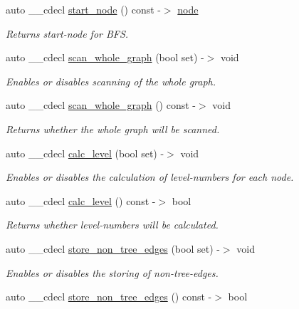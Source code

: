\begin{DoxyCompactItemize}
auto \+\_\+\+\_\+cdecl \mbox{\hyperlink{classbfs_a80a7ae50880684eb261e7e8e807645ef}{start\+\_\+node}} () const -\/$>$ \mbox{\hyperlink{classnode}{node}}
\begin{DoxyCompactList}\small\item\em Returns start-\/node for B\+FS. \end{DoxyCompactList}\item 
auto \+\_\+\+\_\+cdecl \mbox{\hyperlink{classbfs_ac58d930764e6aa859fe706b1d916b9ad}{scan\+\_\+whole\+\_\+graph}} (bool set) -\/$>$ void
\begin{DoxyCompactList}\small\item\em Enables or disables scanning of the whole graph. \end{DoxyCompactList}\item 
auto \+\_\+\+\_\+cdecl \mbox{\hyperlink{classbfs_a558df71124787874724d67eeace62022}{scan\+\_\+whole\+\_\+graph}} () const -\/$>$ void
\begin{DoxyCompactList}\small\item\em Returns whether the whole graph will be scanned. \end{DoxyCompactList}\item 
auto \+\_\+\+\_\+cdecl \mbox{\hyperlink{classbfs_aa02df0b00c5fbaa29b9a41a211732e0f}{calc\+\_\+level}} (bool set) -\/$>$ void
\begin{DoxyCompactList}\small\item\em Enables or disables the calculation of level-\/numbers for each node. \end{DoxyCompactList}\item 
auto \+\_\+\+\_\+cdecl \mbox{\hyperlink{classbfs_a2d36d5c58653acfb219bed569e399a51}{calc\+\_\+level}} () const -\/$>$ bool
\begin{DoxyCompactList}\small\item\em Returns whether level-\/numbers will be calculated. \end{DoxyCompactList}\item 
auto \+\_\+\+\_\+cdecl \mbox{\hyperlink{classbfs_afed1aa751dbea4b6fb9dbdcea24b04f2}{store\+\_\+non\+\_\+tree\+\_\+edges}} (bool set) -\/$>$ void
\begin{DoxyCompactList}\small\item\em Enables or disables the storing of non-\/tree-\/edges. \end{DoxyCompactList}\item 
auto \+\_\+\+\_\+cdecl \mbox{\hyperlink{classbfs_a9c0188bc1f5a26aa48201640adcaa078}{store\+\_\+non\+\_\+tree\+\_\+edges}} () const -\/$>$ bool

\end{DoxyCompactItemize}

